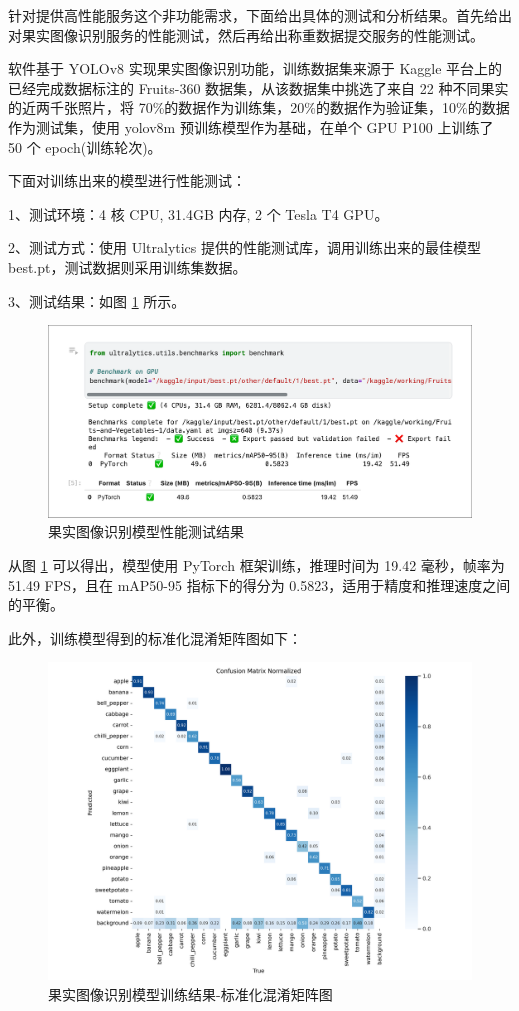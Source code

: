 针对提供高性能服务这个非功能需求，下面给出具体的测试和分析结果。首先给出对果实图像识别服务的性能测试，然后再给出称重数据提交服务的性能测试。

软件基于 YOLOv8 实现果实图像识别功能，训练数据集来源于 Kaggle 平台上的已经完成数据标注的 Fruits-360 数据集，从该数据集中挑选了来自 22 种不同果实的近两千张照片，将 70\%的数据作为训练集，20\%的数据作为验证集，10\%的数据作为测试集，使用 yolov8m 预训练模型作为基础，在单个 GPU P100 上训练了 50 个 epoch(训练轮次)。

下面对训练出来的模型进行性能测试：

1、测试环境：4 核 CPU, 31.4GB 内存, 2 个 Tesla T4 GPU。

2、测试方式：使用 Ultralytics 提供的性能测试库，调用训练出来的最佳模型 best.pt，测试数据则采用训练集数据。

3、测试结果：如图 \ref{fig:model-benchmark} 所示。

\begin{figure}[H]
    \centering
    \includegraphics[width=0.8\linewidth]{../source/aws-img/yolov8/benchmark.png}
    \caption{果实图像识别模型性能测试结果}
    \label{fig:model-benchmark}
\end{figure}

从图 \ref{fig:model-benchmark} 可以得出，模型使用 PyTorch 框架训练，推理时间为 19.42 毫秒，帧率为 51.49 FPS，且在 mAP50-95 指标下的得分为 0.5823，适用于精度和推理速度之间的平衡。

此外，训练模型得到的标准化混淆矩阵图如下：

\begin{figure}[H]
    \centering
    \includegraphics[width=0.8\linewidth]{../source/aws-img/yolov8/out/image/confusion_matrix_normalized.png}
    \caption{果实图像识别模型训练结果-标准化混淆矩阵图}
    \label{fig:confusion_matrix_normalized}
\end{figure}

